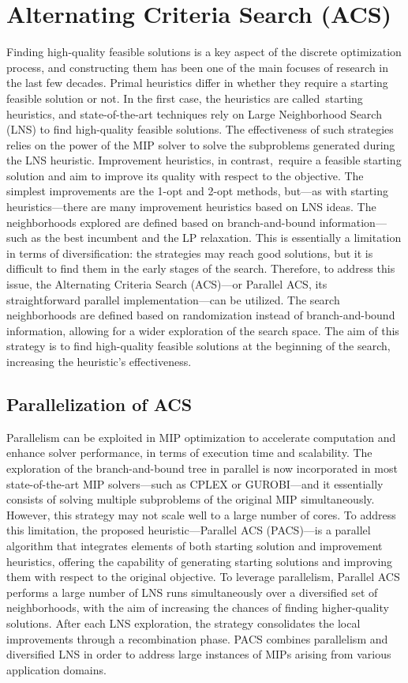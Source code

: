 \section{Alternating Criteria Search (ACS)}
Finding high-quality feasible solutions is a key aspect of the discrete optimization process, and constructing them has been one of the main focuses of research in the last few decades.  
Primal heuristics differ in whether they require a starting feasible solution or not. In the first case, the heuristics are called starting heuristics, and state-of-the-art techniques rely on Large Neighborhood Search (LNS)\cite{LNS} to find high-quality feasible solutions. The effectiveness of such strategies relies on the power of the MIP solver to solve the subproblems generated during the LNS heuristic.  
Improvement heuristics, in contrast, require a feasible starting solution and aim to improve its quality with respect to the objective. The simplest improvements are the 1-opt and 2-opt\cite{2opt} methods, but—as with starting heuristics—there are many improvement heuristics based on LNS ideas. The neighborhoods explored are defined based on branch-and-bound information—such as the best incumbent and the LP relaxation.  
This is essentially a limitation in terms of diversification: the strategies may reach good solutions, but it is difficult to find them in the early stages of the search.  
Therefore, to address this issue, the Alternating Criteria Search (ACS)\cite{ACS}—or Parallel ACS, its straightforward parallel implementation—can be utilized. The search neighborhoods are defined based on randomization instead of branch-and-bound information, allowing for a wider exploration of the search space. The aim of this strategy is to find high-quality feasible solutions at the beginning of the search, increasing the heuristic's effectiveness.

\subsection{Parallelization of ACS}
Parallelism can be exploited in MIP optimization to accelerate computation and enhance solver performance, in terms of execution time and scalability.
The exploration of the branch-and-bound tree in parallel is now incorporated in most state-of-the-art MIP solvers—such as CPLEX or GUROBI—and it essentially consists of solving multiple subproblems of the original MIP simultaneously.  
However, this strategy may not scale well to a large number of cores\cite{largeParallel}.  
To address this limitation, the proposed heuristic—Parallel ACS (PACS)—is a parallel algorithm that integrates elements of both starting solution and improvement heuristics, offering the capability of generating starting solutions and improving them with respect to the original objective.  
To leverage parallelism, Parallel ACS performs a large number of LNS runs simultaneously over a diversified set of neighborhoods, with the aim of increasing the chances of finding higher-quality solutions. After each LNS exploration, the strategy consolidates the local improvements through a recombination phase.  
PACS combines parallelism and diversified LNS in order to address large instances of MIPs arising from various application domains.

